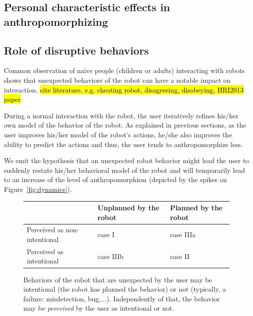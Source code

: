 \documentclass[lettersize, apacite, twoside, HRI]{apa_HRI}
\begin{document}
\subsection{Personal characteristic effects in anthropomorphizing}
\label{sec:8.3}

\subsection{Role of disruptive behaviors}
\label{sec:disruptive}

Common observation of naive people (children or adults) interacting with robots
shows that unexpected behaviors of the robot can have a notable impact on
interaction. \hl{cite literature, e.g. cheating robot, disagreeing, disobeying, HRI2013 paper}

During a normal interaction with the robot, the user iteratively refines his/her own
model of the behavior of the robot. As explained in previous sections, as the
user improves his/her model of the robot's actions, he/she also improves the ability to predict
the actions and thus, the user tends to anthropomorphize less.

We emit the hypothesis that an unexpected robot behavior might lead the user to
suddenly restate his/her behavioral model of the robot and will temporarily lead to
an increase of the level of anthropomorphism (depicted by the spikes on
Figure~\ref{fig:dynamics}).

\begin{figure}
\begin{center}
    \begin{tabular}{ | >{\centering\arraybackslash}m{1.5cm} | >{\centering\arraybackslash}m{2cm} | >{\centering\arraybackslash}m{2cm} |}
    \hline
     & Unplanned by the robot & Planned by the robot \\ \hline
    Perceived as non-intentional & case I  & case IIIa  \\ \hline
    Perceived as intentional &  case IIIb & case II  \\ \hline
    \end{tabular}
\end{center}
\caption{
    Behaviors of the robot that are unexpected by the user may be intentional
    (the robot has planned the behavior) or not (typically, a failure:
    misdetection, bug,...). Independently of that, the behavior may be
    \emph{perceived} by the user as intentional or not.}
\label{fig:perceptionUnexpectedBehavior}
\end{figure}
\end{document}
